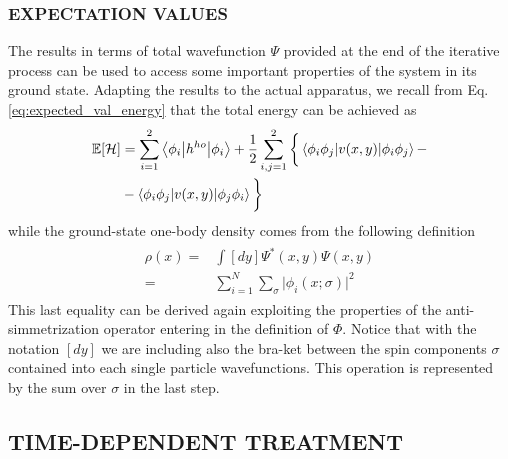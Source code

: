 \subsubsection{EXPECTATION VALUES}
The results in terms of total wavefunction $\Psi$ provided at the end of the iterative process can be used to access some important properties of the system in its ground state. Adapting the results to the actual apparatus, we recall from Eq.\,\ref{eq:expected_val_energy} that the total energy can be achieved as
\begin{align}
\begin{split}
    \mathbb{E}[\mathcal{H}] &= \sum_{i=1}^2 \bracketOP{\phi_i}{\phi_i}{h^{ho}} + \frac{1}{2} \sum_{i,j=1}^2 \bigg\{ \bracketOP{\phi_i \phi_j}{\phi_i \phi_j }{v(x,y)} - \\
    &- \bracketOP{\phi_i \phi_j}{\phi_j \phi_i }{v(x,y)} \bigg\} 
\end{split}
\label{eq:total_energy_no_coeff}
\end{align}
while the ground-state one-body density comes from the following definition 
\begin{align}
\begin{split}
    \rho(x) =& \int [dy] \Psi^*(x,y) \Psi(x,y) \\
    =& \sum_{i=1}^N \sum_{\sigma} \vert \phi_i(x; \sigma) \vert^2
\end{split}
\label{eq:one_body_density_no_coeff}
\end{align}
This last equality can be derived again exploiting the properties of the anti-simmetrization operator entering in the definition of $\Phi$. Notice that with the notation $[dy]$ we are including also the bra-ket between the spin components $\sigma$ contained into each single particle wavefunctions. This operation is represented by the sum over $\sigma$ in the last step.


\subsection{TIME-DEPENDENT TREATMENT}
